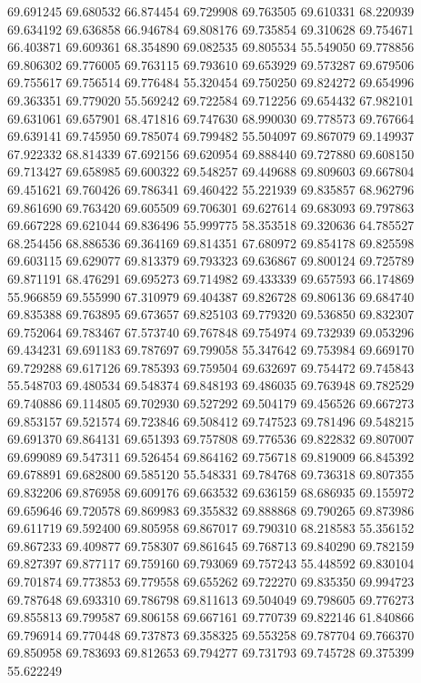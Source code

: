 69.691245
69.680532
66.874454
69.729908
69.763505
69.610331
68.220939
69.634192
69.636858
66.946784
69.808176
69.735854
69.310628
69.754671
66.403871
69.609361
68.354890
69.082535
69.805534
55.549050
69.778856
69.806302
69.776005
69.763115
69.793610
69.653929
69.573287
69.679506
69.755617
69.756514
69.776484
55.320454
69.750250
69.824272
69.654996
69.363351
69.779020
55.569242
69.722584
69.712256
69.654432
67.982101
69.631061
69.657901
68.471816
69.747630
68.990030
69.778573
69.767664
69.639141
69.745950
69.785074
69.799482
55.504097
69.867079
69.149937
67.922332
68.814339
67.692156
69.620954
69.888440
69.727880
69.608150
69.713427
69.658985
69.600322
69.548257
69.449688
69.809603
69.667804
69.451621
69.760426
69.786341
69.460422
55.221939
69.835857
68.962796
69.861690
69.763420
69.605509
69.706301
69.627614
69.683093
69.797863
69.667228
69.621044
69.836496
55.999775
58.353518
69.320636
64.785527
68.254456
68.886536
69.364169
69.814351
67.680972
69.854178
69.825598
69.603115
69.629077
69.813379
69.793323
69.636867
69.800124
69.725789
69.871191
68.476291
69.695273
69.714982
69.433339
69.657593
66.174869
55.966859
69.555990
67.310979
69.404387
69.826728
69.806136
69.684740
69.835388
69.763895
69.673657
69.825103
69.779320
69.536850
69.832307
69.752064
69.783467
67.573740
69.767848
69.754974
69.732939
69.053296
69.434231
69.691183
69.787697
69.799058
55.347642
69.753984
69.669170
69.729288
69.617126
69.785393
69.759504
69.632697
69.754472
69.745843
55.548703
69.480534
69.548374
69.848193
69.486035
69.763948
69.782529
69.740886
69.114805
69.702930
69.527292
69.504179
69.456526
69.667273
69.853157
69.521574
69.723846
69.508412
69.747523
69.781496
69.548215
69.691370
69.864131
69.651393
69.757808
69.776536
69.822832
69.807007
69.699089
69.547311
69.526454
69.864162
69.756718
69.819009
66.845392
69.678891
69.682800
69.585120
55.548331
69.784768
69.736318
69.807355
69.832206
69.876958
69.609176
69.663532
69.636159
68.686935
69.155972
69.659646
69.720578
69.869983
69.355832
69.888868
69.790265
69.873986
69.611719
69.592400
69.805958
69.867017
69.790310
68.218583
55.356152
69.867233
69.409877
69.758307
69.861645
69.768713
69.840290
69.782159
69.827397
69.877117
69.759160
69.793069
69.757243
55.448592
69.830104
69.701874
69.773853
69.779558
69.655262
69.722270
69.835350
69.994723
69.787648
69.693310
69.786798
69.811613
69.504049
69.798605
69.776273
69.855813
69.799587
69.806158
69.667161
69.770739
69.822146
61.840866
69.796914
69.770448
69.737873
69.358325
69.553258
69.787704
69.766370
69.850958
69.783693
69.812653
69.794277
69.731793
69.745728
69.375399
55.622249
